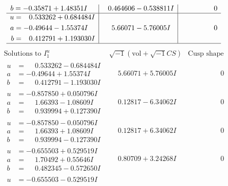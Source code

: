 \documentclass[1p]{elsarticle_modified}
\theoremstyle{definition}
\newcommand{\I}{\sqrt{-1}}
\begin{document}
$$\begin{array}{c|c|c}
\begin{aligned}
b &= -0.35871 + 1.48351 I\end{aligned}
 & \phantom{-}0.464606 - 0.538811 I & \phantom{-0.000000 } 0 \\ \hline\begin{aligned}
u &= \phantom{-}0.533262 + 0.684484 I \\
a &= -0.49644 - 1.55374 I \\
b &= \phantom{-}0.412791 + 1.193030 I\end{aligned}
 & \phantom{-}5.66071 - 5.76005 I & \phantom{-0.000000 } 0\\
 \hline 
 \end{array}$$\newpage$$\begin{array}{c|c|c}  
\text{Solutions to }I^u_{1}& \I (\text{vol} + \sqrt{-1}CS) & \text{Cusp shape}\\
 \hline 
\begin{aligned}
u &= \phantom{-}0.533262 - 0.684484 I \\
a &= -0.49644 + 1.55374 I \\
b &= \phantom{-}0.412791 - 1.193030 I\end{aligned}
 & \phantom{-}5.66071 + 5.76005 I & \phantom{-0.000000 } 0 \\ \hline\begin{aligned}
u &= -0.857850 + 0.050796 I \\
a &= \phantom{-}1.66393 - 1.08609 I \\
b &= \phantom{-}0.939994 + 0.127390 I\end{aligned}
 & \phantom{-}0.12817 - 6.34062 I & \phantom{-0.000000 } 0 \\ \hline\begin{aligned}
u &= -0.857850 - 0.050796 I \\
a &= \phantom{-}1.66393 + 1.08609 I \\
b &= \phantom{-}0.939994 - 0.127390 I\end{aligned}
 & \phantom{-}0.12817 + 6.34062 I & \phantom{-0.000000 } 0 \\ \hline\begin{aligned}
u &= -0.655503 + 0.529519 I \\
a &= \phantom{-}1.70492 + 0.55646 I \\
b &= \phantom{-}0.482345 - 0.572650 I\end{aligned}
 & \phantom{-}0.80709 + 3.24268 I & \phantom{-0.000000 } 0 \\ \hline\begin{aligned}
u &= -0.655503 - 0.529519 I \\

\end{aligned}
\end{array}$$
\end{document}
